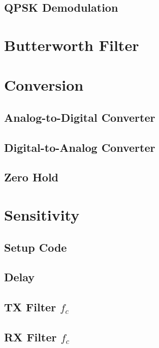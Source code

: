 \documentclass[]{article}
\begin{document}
\subsection{QPSK Demodulation}
\label{app:qpsk_demod}


\section{Butterworth Filter}
\label{app:butterworth}


\section{Conversion}
\label{app:convert}
\subsection{Analog-to-Digital Converter}
\label{app:ad}

\subsection{Digital-to-Analog Converter}
\label{app:da}


\subsection{Zero Hold}
\label{app:zero}



\section{Sensitivity}
\label{app:sensitivity}
\subsection{Setup Code}


\subsection{Delay}
\label{app:delay}


\subsection{TX Filter $f_c$}
\label{app:freqTX}


\subsection{RX Filter $f_c$}
\label{app:freqRX}

\end{document}
